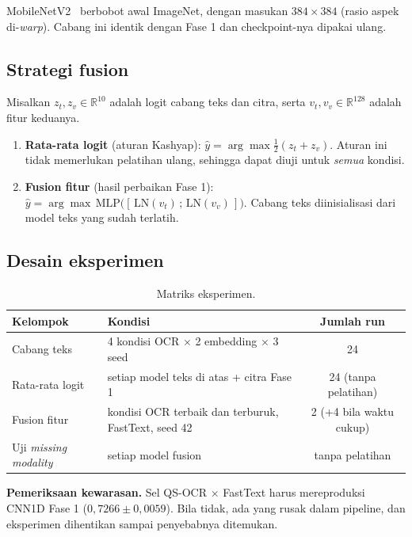 \documentclass[11pt,a4paper]{article}
\begin{document}
MobileNetV2~\cite{sandler2018} berbobot awal ImageNet, dengan masukan $384\times384$
(rasio aspek di-\textit{warp}). Cabang ini identik dengan Fase 1 dan checkpoint-nya
dipakai ulang.

\subsection{Strategi fusion}

Misalkan $z_t, z_v \in \mathbb{R}^{10}$ adalah logit cabang teks dan citra, serta
$v_t, v_v \in \mathbb{R}^{128}$ adalah fitur keduanya.
\begin{enumerate}
  \item \textbf{Rata-rata logit} (aturan Kashyap): $\hat{y} = \arg\max \tfrac{1}{2}(z_t
  + z_v)$. Aturan ini tidak memerlukan pelatihan ulang, sehingga dapat diuji untuk
  \emph{semua} kondisi.
  \item \textbf{Fusion fitur} (hasil perbaikan Fase 1):
  $\hat{y} = \arg\max\, \text{MLP}\big([\,\text{LN}(v_t)\,;\,\text{LN}(v_v)\,]\big)$.
  Cabang teks diinisialisasi dari model teks yang sudah terlatih.
\end{enumerate}

\subsection{Desain eksperimen}

\begin{table}[H]
\centering\small
\caption{Matriks eksperimen.}
\label{tab:desain}
\begin{tabularx}{\textwidth}{@{}p{3.8cm} L c@{}}
\toprule
Kelompok & Kondisi & Jumlah run \\
\midrule
Cabang teks & 4 kondisi OCR $\times$ 2 embedding $\times$ 3 seed & 24 \\
Rata-rata logit & setiap model teks di atas + citra Fase 1 & 24 (tanpa pelatihan) \\
Fusion fitur & kondisi OCR terbaik dan terburuk, FastText, seed 42 & 2 (+4 bila waktu cukup) \\
Uji \textit{missing modality} & setiap model fusion & tanpa pelatihan \\
\bottomrule
\end{tabularx}
\end{table}

\noindent\textbf{Pemeriksaan kewarasan.} Sel QS-OCR $\times$ FastText harus mereproduksi
CNN1D Fase 1 ($0{,}7266 \pm 0{,}0059$). Bila tidak, ada yang rusak dalam pipeline, dan
eksperimen dihentikan sampai penyebabnya ditemukan.
\end{document}
